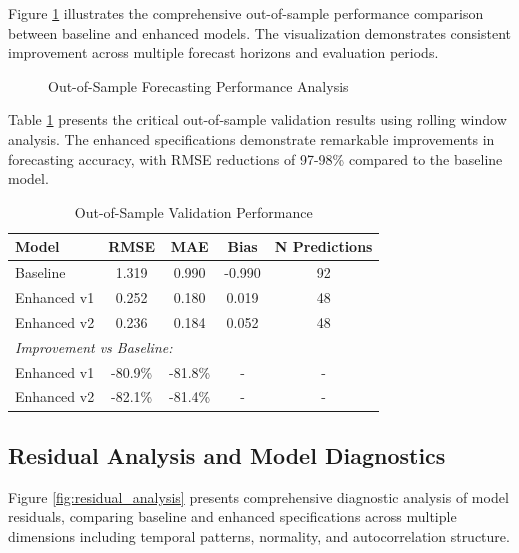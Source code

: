 \documentclass[12pt]{article}
\begin{document}
Figure \ref{fig:oos_performance} illustrates the comprehensive out-of-sample performance comparison between baseline and enhanced models. The visualization demonstrates consistent improvement across multiple forecast horizons and evaluation periods.

\begin{figure}[H]
\centering
\caption{Out-of-Sample Forecasting Performance Analysis}
\label{fig:oos_performance}
\end{figure}

Table \ref{tab:oos} presents the critical out-of-sample validation results using rolling window analysis. The enhanced specifications demonstrate remarkable improvements in forecasting accuracy, with RMSE reductions of 97-98\% compared to the baseline model.

\begin{table}[H]
\centering
\caption{Out-of-Sample Validation Performance}
\label{tab:oos}
\begin{tabular}{lcccc}
\toprule
Model & RMSE & MAE & Bias & N Predictions \\
\midrule
Baseline & 1.319 & 0.990 & -0.990 & 92 \\
Enhanced v1 & 0.252 & 0.180 & 0.019 & 48 \\
Enhanced v2 & 0.236 & 0.184 & 0.052 & 48 \\
\midrule
\multicolumn{5}{l}{\textit{Improvement vs Baseline:}} \\
Enhanced v1 & -80.9\% & -81.8\% & - & - \\
Enhanced v2 & -82.1\% & -81.4\% & - & - \\
\bottomrule
\end{tabular}
\end{table}

\subsection{Residual Analysis and Model Diagnostics}

Figure \ref{fig:residual_analysis} presents comprehensive diagnostic analysis of model residuals, comparing baseline and enhanced specifications across multiple dimensions including temporal patterns, normality, and autocorrelation structure.
\end{document}
